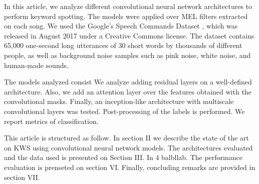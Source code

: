 In this article, we analyze different convolutional neural network architectures to perform keyword spotting. The models were applied over MEL filters extracted on each song. We used the Google’s Speech Commands Dataset \cite{warden2018speech},  which  was  released in  August  2017 under a Creative  Commons license. The  dataset contains  65,000 one-second long utterances of 30 short words by thousands of different people, as well as background noise samples such as pink noise, white noise, and human-made sounds.  

The models analyzed consist 
We analyze adding residual layers on a well-defined architecture. Also, we add an attention layer over the features obtained with the convolutional masks. Finally, an inception-like architecture with multiscale convolutional layers was tested. Post-processing of the labels is performed. We report metrics of classification.


This article is structured as follow. In section II we describe the state of the art on KWS using convolutional neural network models. The architectures evaluated and the data used is presented on Section III. In 4 balbllab. The performance evaluation is prenseted on section VI. Finally, concluding remarks are provided in section VII.

